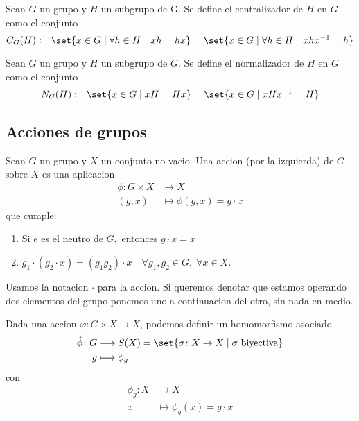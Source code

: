 \begin{definition}
	Sean \(G \) un grupo y \(H\) un subgrupo de G. Se define el centralizador de \(H \) en \(G \) como el conjunto
	\[
		C_G (H) \coloneqq \set{x \in G \mid \forall h \in H \quad xh = hx} = \set{x \in G \mid \forall h \in H \quad xhx^{-1} = h }
	\]
\end{definition}

\begin{definition}
	Sean \(G \) un grupo y \(H\) un subgrupo de \(G \). Se define el normalizador de \(H \) en \(G \) como el conjunto
	\[
		N_G (H) \coloneqq \set{x \in G \mid xH = Hx} = \set{x \in G \mid xHx^{-1} = H }
	\]
\end{definition}
\subsection{Acciones de grupos}
\begin{definition}
	Sean \(G \) un grupo y \(X \) un conjunto no vacio. Una accion (por la izquierda) de \(G \) sobre \(X \) es una aplicacion
	\[
		\begin{aligned}
			\phi\colon G \times X & \longrightarrow X                  \\
			(g,x)                 & \longmapsto \phi(g,x) = g \cdot x
		\end{aligned}
	\]
	que cumple:
	\begin{enumerate}
		\item Si \(e \) es el neutro de \(G, \) entonces \(g \cdot x = x \)
		\item \(g_1 \cdot(g_2 \cdot x) = (g_1 g_2) \cdot x \quad \forall g_1, g_2 \in G, \; \forall x \in X\).
	\end{enumerate}
	Usamos la notacion \(\cdot \) para la accion. Si queremos denotar que estamos operando dos elementos del grupo ponemos uno a continuacion del otro, sin nada en medio.
\end{definition}
\begin{proposition}
	Dada una accion \(\varphi \colon G \times X \to X \), podemos definir un homomorfismo asociado
	\[
		\begin{aligned}
			\hat{\phi} \colon G & \longrightarrow S(X) = \set{\sigma\colon X \to X \mid \sigma \text{ biyectiva} } \\
			g                   & \longmapsto \phi_g
		\end{aligned}
	\]
	con
	\[
		\begin{aligned}
			\phi_g \colon X & \longrightarrow X                    \\
			x               & \longmapsto \phi_g (x ) = g \cdot x
		\end{aligned}
	\]
\end{proposition}
